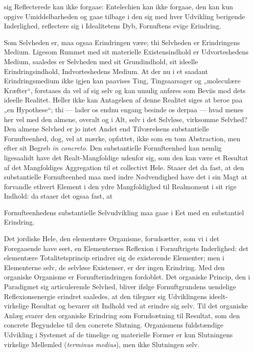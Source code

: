 \documentclass[12pt,a4paper]{book}
\begin{document}
sig Reflecterede kan ikke forgaae: Entelechien kan ikke forgaae, den kan
kun opgive Umiddelbarheden og gaae tilbage i den sig med hver Udvikling
berigende Inderlighed, reflectere sig i Idealitetens Dyb, Fornuftens evige
Erindring.

Som Selvheden er, maa ogsaa Erindringen være; thi Selvheden er
Erindringens Medium. Ligesom Rummet med sit materielle Existensindhold er
Udvorteshedens Medium, saaledes er Selvheden med sit Grundindhold, sit
ideelle Erindringsindhold, Indvorteshedens Medium. At der nu i et saadant
Erindringsmedium ikke igjen kan paavises Ting, Tingsaarsager og
„moleculære Kræfter“, forstaaes da vel af sig selv og kan umulig anføres
som Beviis mod dets ideelle Realitet. Heller ikke kan Antagelsen af denne
Realitet siges at beroe paa „en Hypothese“; thi --- lader os endnu engang
besinde os derpaa --- hvad menes her vel med den almene, overalt og i Alt,
selv i det Selvløse, virksomme Selvhed? Den almene Selvhed er jo intet
Andet end Tilværelsens substantielle Fornufteenhed, dog, vel at mærke,
opfattet, ikke som en tom Abstraction, men efter sit Begreb
\textit{in concreto}. Den substantielle Fornufteenhed kan nemlig
ligesaalidt have det Realt-Mangfoldige udenfor sig, som den kan være et
Resultat af det Mangfoldiges Aggregation til et collectivt Hele. Staaer
det da fast, at den substantielle Fornufteenhed maa med indre Nødvendighed
have det i sin Magt at forvandle ethvert Element i den ydre Mangfoldighed
til Realmoment i sit rige Indhold: da staaer det ogsaa fast, at

\setcounter{footnote}{0}
Fornufteenhedens substantielle Selvudvikling maa gaae i Eet med en
substantiel Erindring.

Det jordiske Hele, den elementære Organisme, forudsætter, som vi i det
Foregaaende have seet, en Elementernes Reflexion i Fornuftrigets
Inderlighed: det elementære Totalitetsprincip erindrer sig de existerende
Elementer; men i Elementerne selv, de selvløse Existenser, er der ingen
Erindring. Med den organiske Organisme er Fornufterindringen fordoblet.
Det organiske Princip, den i Paradigmet sig articulerende Selvhed, bliver
ifølge Fornuftgrundens uendelige Reflexionsenergie erindret saaledes, at
den tilegner sig Udviklingens ideelt-virkelige Resultat og bevarer sit
Indhold ved at erindre sig selv. Til det organiske Anlæg svarer den
organiske Erindring som Forudsætning til Resultat, som den concrete
Begyndelse til den concrete Slutning. Organismens fuldstændige Udvikling i
Systemet af de timelige og materielle Former er kun Slutningens virkelige
Mellemled (\textit{terminus medius}), men ikke Slutningen selv.
\end{document}
